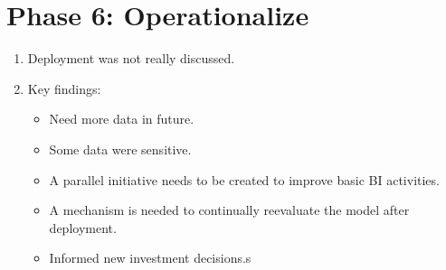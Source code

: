 \documentclass{article}
\begin{document}
\section{Phase 6: Operationalize}
\begin{enumerate}
    \item Deployment was not really discussed.
    \item Key findings:
    \begin{itemize}
        \item Need more data in future.
        \item Some data were sensitive.
        \item A parallel initiative needs to be created to improve basic BI activities.
        \item A mechanism is needed to continually reevaluate the model after deployment.
        \item Informed new investment decisions.s
    \end{itemize}
\end{enumerate}
\end{document}
